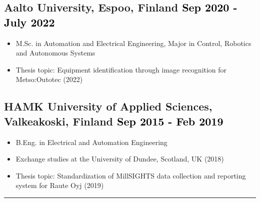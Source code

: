 \documentclass[a4paper,10pt]{article}
\begin{document}
\subsection*{Aalto University, Espoo, Finland \hfill \textcolor{black}{Sep 2020 - July 2022}}
\begin{itemize}
    \item M.Sc. in Automation and Electrical Engineering, Major in Control, Robotics and Autonomous Systems
    \item Thesis topic: Equipment identification through image recognition for Metso:Outotec (2022)
\end{itemize}

\subsection*{HAMK University of Applied Sciences, Valkeakoski, Finland \hfill \textcolor{black}{Sep 2015 - Feb 2019}}
\begin{itemize}
    \item B.Eng. in Electrical and Automation Engineering
    \item Exchange studies at the University of Dundee, Scotland, UK (2018)
    \item Thesis topic: Standardization of MillSIGHTS data collection and reporting system for Raute Oyj (2019)
\end{itemize}

\vspace{0.2cm}
\hrule
\vspace{0.1cm}
\end{document}
